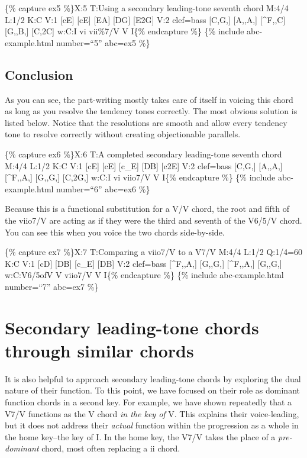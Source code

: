 \documentclass{book}
\begin{document}
\{\% capture ex5 \%\}X:5 T:Using a secondary leading-tone seventh chord M:4/4
L:1/2 K:C V:1 {[}cE{]} {[}cE{]}\textbar{} {[}EA{]} {[}DG{]}\textbar{}
{[}E2G{]}\textbar{]} V:2 clef=bass {[}C,G,{]} {[}A,,A,{]}\textbar{}
{[}\^{}F,,C{]} {[}G,,B,{]}\textbar{} {[}C,2C{]}\textbar{]} w:C:I vi vii\%7/V V
I\{\% endcapture \%\} \{\% include abc-example.html number=``5'' abc=ex5 \%\}

\hypertarget{conclusion-14}{%
\subsection{Conclusion}\label{conclusion-14}}

As you can see, the part-writing mostly takes care of itself in voicing this
chord as long as you resolve the tendency tones correctly. The most obvious
solution is listed below. Notice that the resolutions are smooth and allow
every tendency tone to resolve correctly without creating objectionable
parallels.

\{\% capture ex6 \%\}X:6 T:A completed secondary leading-tone seventh chord
M:4/4 L:1/2 K:C V:1 {[}cE{]} {[}cE{]}\textbar{} {[}c\_E{]} {[}DB{]}\textbar{}
{[}c2E{]}\textbar{]} V:2 clef=bass {[}C,G,{]} {[}A,,A,{]}\textbar{}
{[}\^{}F,,A,{]} {[}G,,G,{]}\textbar{} {[}C,2G,{]}\textbar{]} w:C:I vi viio7/V
V I\{\% endcapture \%\} \{\% include abc-example.html number=``6'' abc=ex6
\%\}

Because this is a functional substitution for a V/V chord, the root and fifth
of the viio7/V are acting as if they were the third and seventh of the V6/5/V
chord. You can see this when you voice the two chords side-by-side.

\{\% capture ex7 \%\}X:7 T:Comparing a viio7/V to a V7/V M:4/4 L:1/2 Q:1/4=60
K:C V:1 {[}cD{]} {[}DB{]}\textbar{} {[}c\_E{]} {[}DB{]}\textbar{]} V:2
clef=bass {[}\^{}F,,A,{]} {[}G,,G,{]}\textbar{} {[}\^{}F,,A,{]}
{[}G,,G,{]}\textbar{]} w:C:V6/5ofV V viio7/V V I\{\% endcapture \%\} \{\%
include abc-example.html number=``7'' abc=ex7 \%\}

\hypertarget{secondary-leading-tone-chords-through-similar-chords}{%
\section{Secondary leading-tone chords through similar
chords}\label{secondary-leading-tone-chords-through-similar-chords}}

It is also helpful to approach secondary leading-tone chords by exploring the
dual nature of their function. To this point, we have focused on their role as
dominant function chords in a second key. For example, we have shown
repeatedly that a V7/V functions as the V chord \emph{in the key of} V. This
explains their voice-leading, but it does not address their \emph{actual}
function within the progression as a whole in the home key--the key of I. In
the home key, the V7/V takes the place of a \emph{pre-dominant} chord, most
often replacing a ii chord.
\end{document}
